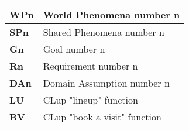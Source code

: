     \begin{center}
        {\renewcommand{\arraystretch}{2.4}%
        \begin{tabular}{L{2cm}L{14cm}}
            \hline
            \textbf{WPn} & World Phenomena number n \\
            \hline
            \textbf{SPn} & Shared Phenomena number n \\
            \hline
            \textbf{Gn} & Goal number n \\
            \hline
            \textbf{Rn} & Requirement number n \\
            \hline
            \textbf{DAn} & Domain Assumption number n \\
            \hline
            \textbf{LU} & CLup "lineup" function \\
            \hline
            \textbf{BV} & CLup "book a visit" function \\
            \hline
        \end{tabular}}
    \end{center}
